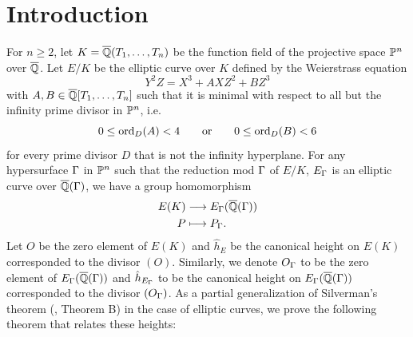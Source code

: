 \documentclass[12pt,reqno]{amsart}
\begin{document}
\begin{abstract}
For $n\geq 2$, let $K=\overline{\QQ}(\PP^n)=\overline{\QQ}(T_1, \ldots, T_n)$. Let $E/K$ be the elliptic curve defined by a minimal Weierstrass equation $y^2=x^3+Ax+B$, with $A,B \in \overline{\QQ}[T_1, \ldots, T_n]$. There's a canonical height $\hat{h}_{E}$ on $E(K)$ induced by the divisor $(O)$, where $O$ is the zero element of $E(K)$. On the other hand, for each smooth hypersurface $\G$ in $\PP^n$ such that the reduction mod $\G$  of $E$, $E_{\G} / \overline{\QQ}(\G)$ is an elliptic curve with the zero element $O_\G$, there is also a canonical height $\hat{h}_{E_{\G}}$ on $E_{\G}(\overline{\QQ}(\G))$ that is induced by $ (O_\G)$. We prove that for any $P \in E(K)$, the equality $\hat{h}_{E_{\G}}(P_\G)/ \deg \G =\hat{h}_{E}(P)$ holds for almost all hypersurfaces in $\PP^n$. As a consequence, we show that for infinitely many $t \in \PP^n(\overline{\QQ})$, the specialization map $\sigma_t : E(K) \rightarrow E_t(\overline{\QQ})$ is injective.
\end{abstract}
\maketitle
\section{Introduction}
For $n \geq 2$, let $K=\overline{\mathbb{Q}}(T_1, \ldots, T_n)$ be the function field of the projective space $\PP^n$ over $\overline{\mathbb{Q}}$. Let $E/K$ be the elliptic curve over $K$ defined by the Weierstrass equation  
$$ Y^2Z=X^3+AXZ^2+BZ^3 $$ with $A,B \in \overline{\mathbb{Q}}[T_1, \ldots, T_n]$ such that it is minimal with respect to all but the infinity prime divisor in $\PP^n$, i.e. $$0\leq\operatorname{ord}_D(A) <4 \qquad \text{or}\qquad  0\leq \operatorname{ord}_D(B)<6  $$  for every prime divisor $D$ that is not the infinity hyperplane. %
For any hypersurface $\G$ in $\PP^n$ %
such that the reduction mod $\G$ of $E/K$, $E_\Gamma$ is an elliptic curve over $\overline{\mathbb{Q}}(\Gamma)$, we have a group homomorphism 
\begin{align*}
E(K) &\longrightarrow E_\Gamma(\overline{\mathbb{Q}}(\Gamma)) \\
P &\longmapsto P_\Gamma.
\end{align*} 
Let $O$  be the zero element of $E(K)$ and $\hat{h}_E$ be the canonical height on $E(K)$ corresponded to the divisor $(O)$. Similarly, we denote $O_\G$ to be the zero element of $E_\Gamma(\overline{\mathbb{Q}}(\Gamma))$ and $\hat{h}_{E_\Gamma}$ to be the canonical height on $E_\Gamma(\overline{\mathbb{Q}}(\Gamma))$ corresponded to the divisor $(O_\G)$. As a partial generalization of Silverman's theorem (\cite{SHS}, Theorem B) in the case of elliptic curves, we prove the following theorem that relates these heights:
\end{document}
